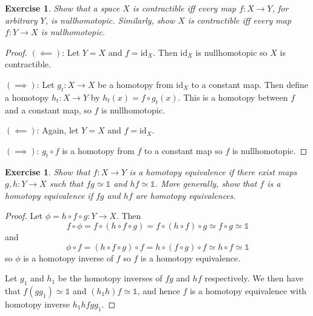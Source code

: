 \documentclass{article}
\newtheorem{exercise}[theorem]{Exercise}
\begin{document}
\begin{exercise}
Show that a space $X$ is contractible iff every map $f:X\to Y$, for arbitrary $Y$, is
nullhomotopic. Similarly, show $X$ is contractible iff every map $f:Y\to X$ is nullhomotopic.
\end{exercise}
\begin{proof}
$(\impliedby)$: Let $Y=X$ and $f=\text{id}_X$. Then $\text{id}_X$ is nullhomotopic so $X$ is contractible.

$(\implies)$: Let $g_t:X\to X$ be a homotopy from $\text{id}_X$ to a constant map. Then define a homotopy $h_t:X\to Y$ by $h_t(x)=f\circ g_t(x)$. This is a homotopy between $f$ and a constant map, so $f$ is nullhomotopic.

$(\impliedby)$: Again, let $Y=X$ and $f=\text{id}_X$.

$(\implies)$: $g_t\circ f$ is a homotopy from $f$ to a constant map so $f$ is nullhomotopic.
\end{proof}

\begin{exercise}
Show that $f:X\to Y$ is a homotopy equivalence if there exist maps $g,h:Y\to X$ such that $fg\simeq\mathbb{1}$ and $hf\simeq\mathbb{1}$. More generally, show that $f$ is a homotopy equivalence if $fg$ and $hf$ are homotopy equivalences.
\end{exercise}
\begin{proof}
Let $\phi=h\circ f\circ g:Y\to X$. Then\[f\circ\phi=f\circ(h\circ f\circ g)=f\circ(h\circ f)\circ g\simeq f\circ g\simeq\mathbb{1}\] and\[\phi\circ f=(h\circ f\circ g)\circ f=h\circ(f\circ g)\circ f\simeq h\circ f\simeq\mathbb{1}\] so $\phi$ is a homotopy inverse of $f$ so $f$ is a homotopy equivalence.

Let $g_1$ and $h_1$ be the homotopy inverses of $fg$ and $hf$ respectively. We then have that $f(gg_1)\simeq\mathbb{1}$ and $(h_1h)f\simeq\mathbb{1}$, and hence $f$ is a homotopy equivalence with homotopy inverse $h_1hfgg_1$.
\end{proof}
\end{document}
